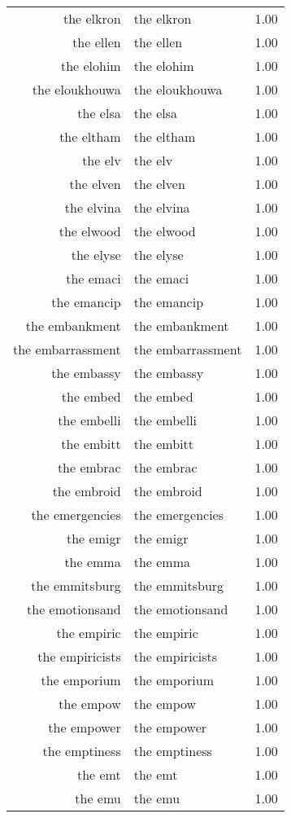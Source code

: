 \begin{table}[ht]
\begin{tabular}{rlr}
  the elkron & the elkron & 1.00 \\ 
  the ellen & the ellen & 1.00 \\ 
  the elohim & the elohim & 1.00 \\ 
  the eloukhouwa & the eloukhouwa & 1.00 \\ 
  the elsa & the elsa & 1.00 \\ 
  the eltham & the eltham & 1.00 \\ 
  the elv & the elv & 1.00 \\ 
  the elven & the elven & 1.00 \\ 
  the elvina & the elvina & 1.00 \\ 
  the elwood & the elwood & 1.00 \\ 
  the elyse & the elyse & 1.00 \\ 
  the emaci & the emaci & 1.00 \\ 
  the emancip & the emancip & 1.00 \\ 
  the embankment & the embankment & 1.00 \\ 
  the embarrassment & the embarrassment & 1.00 \\ 
  the embassy & the embassy & 1.00 \\ 
  the embed & the embed & 1.00 \\ 
  the embelli & the embelli & 1.00 \\ 
  the embitt & the embitt & 1.00 \\ 
  the embrac & the embrac & 1.00 \\ 
  the embroid & the embroid & 1.00 \\ 
  the emergencies & the emergencies & 1.00 \\ 
  the emigr & the emigr & 1.00 \\ 
  the emma & the emma & 1.00 \\ 
  the emmitsburg & the emmitsburg & 1.00 \\ 
  the emotionsand & the emotionsand & 1.00 \\ 
  the empiric & the empiric & 1.00 \\ 
  the empiricists & the empiricists & 1.00 \\ 
  the emporium & the emporium & 1.00 \\ 
  the empow & the empow & 1.00 \\ 
  the empower & the empower & 1.00 \\ 
  the emptiness & the emptiness & 1.00 \\ 
  the emt & the emt & 1.00 \\ 
  the emu & the emu & 1.00 \\ 

\end{tabular}
\end{table}
